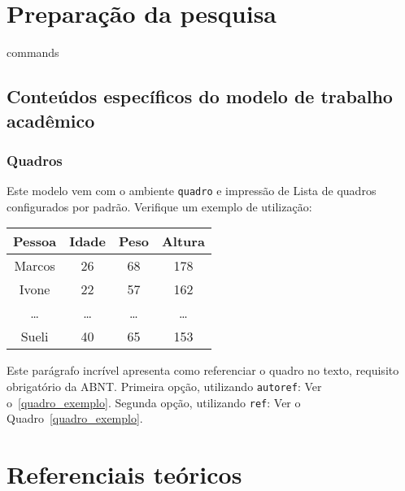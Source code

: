 \part{Preparação da pesquisa}

{commands}

\chapter{Conteúdos específicos do modelo de trabalho acadêmico}%
\label{cap_trabalho_academico}

\section{Quadros}

Este modelo vem com o ambiente \texttt{quadro} e impressão de Lista de quadros
configurados por padrão. Verifique um exemplo de utilização:

\begin{quadro}[htb]
\caption{%
    \label{quadro_exemplo}Exemplo de quadro}
\begin{tabular}{cccc}
    \toprule
    \textbf{Pessoa} & \textbf{Idade} & \textbf{Peso} & \textbf{Altura} \\
    \midrule
    Marcos          & 26             & 68            & 178             \\
    Ivone           & 22             & 57            & 162             \\
    \ldots          & \ldots         & \ldots        & \ldots          \\
    Sueli           & 40             & 65            & 153             \\
    \bottomrule
\end{tabular}
\end{quadro}

Este parágrafo incrível apresenta como referenciar o quadro no texto, requisito
obrigatório da ABNT.\@
Primeira opção, utilizando \texttt{autoref}: Ver o~\autoref{quadro_exemplo}.
Segunda opção, utilizando \texttt{ref}: Ver o Quadro~\ref{quadro_exemplo}.

\part{Referenciais teóricos}
